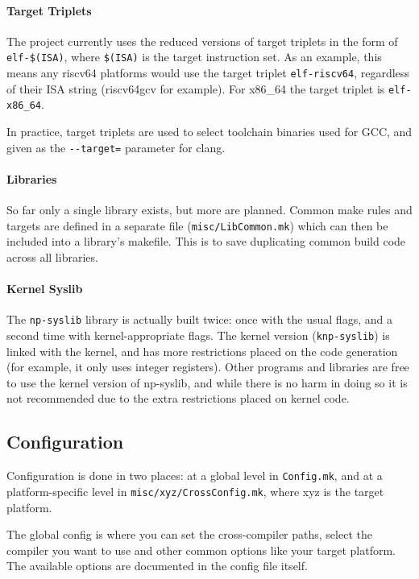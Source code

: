 \paragraph{Target Triplets}
The project currently uses the reduced versions of target triplets in the form of \verb|elf-$(ISA)|, where \verb|$(ISA)| is the target instruction set. As an example, this means any riscv64 platforms would use the target triplet \verb|elf-riscv64|, regardless of their ISA string (riscv64gcv for example). For x86\_64 the target triplet is \verb|elf-x86_64|.

In practice, target triplets are used to select toolchain binaries used for GCC, and given as the \verb|--target=| parameter for clang.

\paragraph{Libraries}
So far only a single library exists, but more are planned. Common make rules and targets are defined in a separate file (\verb|misc/LibCommon.mk|) which can then be included into a library's makefile. This is to save duplicating common build code across all libraries.

\paragraph{Kernel Syslib}
The \verb|np-syslib| library is actually built twice: once with the usual flags, and a second time with kernel-appropriate flags. The kernel version (\verb|knp-syslib|) is linked with the kernel, and has more restrictions placed on the code generation (for example, it only uses integer registers). Other programs and libraries are free to use the kernel version of np-syslib, and while there is no harm in doing so it is not recommended due to the extra restrictions placed on kernel code.

\subsection{Configuration}
Configuration is done in two places: at a global level in \verb|Config.mk|, and at a platform-specific level in \verb|misc/xyz/CrossConfig.mk|, where xyz is the target platform.

The global config is where you can set the cross-compiler paths, select the compiler you want to use and other common options like your target platform. The available options are documented in the config file itself.

